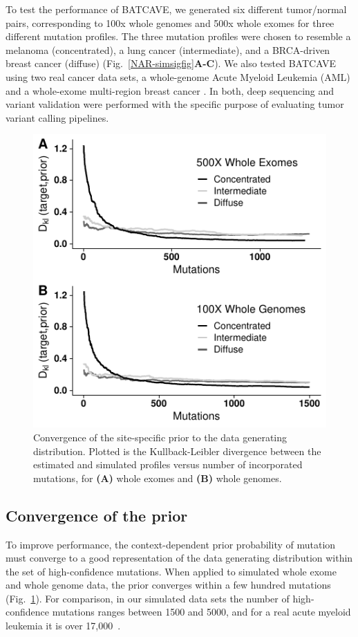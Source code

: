 \documentclass[a4,center,fleqn]{NAR}
\newcommand{\batcave}{BATCAVE\xspace}
\begin{document}
To test the performance of \batcave, we generated six different tumor/normal pairs, corresponding to 100x whole genomes and 500x whole exomes for three different mutation profiles.
The three mutation profiles were chosen to resemble a melanoma (concentrated), a lung cancer (intermediate), and a BRCA-driven breast cancer (diffuse) (Fig.~\ref{NAR-simsigfig}\textbf{A-C}).
We also tested \batcave using two real cancer data sets, a whole-genome Acute Myeloid Leukemia (AML) \citep{Griffith2015} and a whole-exome multi-region breast cancer \cite{Shi2018}.
In both, deep sequencing and variant validation were performed with the specific purpose of evaluating tumor variant calling pipelines.

\begin{figure}
  \begin{center}
  \includegraphics{figures/kl_only.pdf}
  \end{center}
  \caption{Convergence of the site-specific prior to the data generating distribution. Plotted is the Kullback-Leibler divergence between the estimated and simulated profiles versus number of incorporated mutations, for \textbf{(A)} whole exomes and \textbf{(B)} whole genomes.
  }
\label{NAR-kl_fig}
\end{figure}

\subsection{Convergence of the prior}
To improve performance, the context-dependent prior probability of mutation must converge to a good representation of the data generating distribution within the set of high-confidence mutations.
When applied to simulated whole exome and whole genome data, the prior converges within a few hundred mutations (Fig.~\ref{NAR-kl_fig}).
For comparison, in our simulated data sets the number of high-confidence mutations ranges between 1500 and 5000, and for a real acute myeloid leukemia it is over 17,000~\cite{Griffith2015}.
\end{document}
